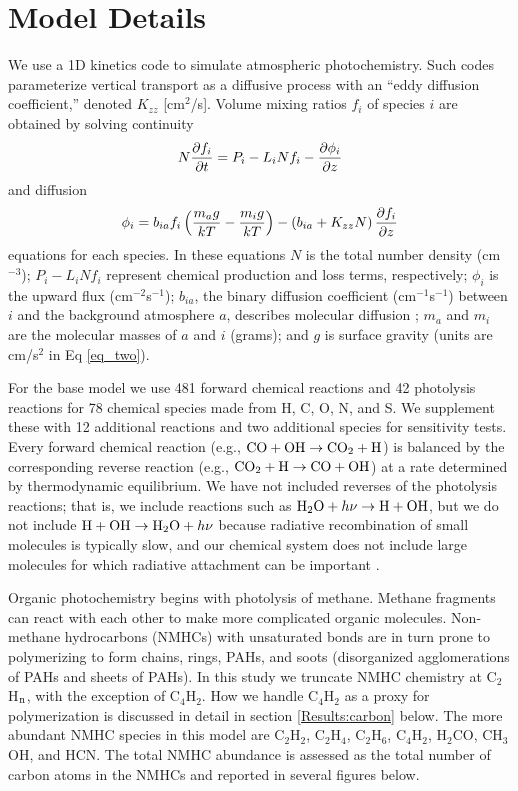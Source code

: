 \documentclass[preprint]{aastex6}
\newcounter{reaction}
\begin{document}
\section{Model Details}

We use a 1D kinetics code to simulate atmospheric photochemistry. 
Such codes parameterize vertical transport as a diffusive process 
with an ``eddy diffusion coefficient,'' denoted $K_{zz}$ [cm$^2$/s].
Volume mixing ratios $f_i$ of species $i$ are obtained by solving continuity
\begin{equation}
\label{eq_one}
N{\partial f_i \over \partial t} = P_i - L_i N f_i - {\partial \phi_i \over \partial z} 
\end{equation}
\noindent and diffusion
\begin{equation}
\label{eq_two}
\phi_i = b_{ia} f_i \left( {m_a g\over kT} - {m_i g\over kT}\right) - \left( b_{ia} + K_{zz}N\right) {\partial f_i \over \partial z}
\end{equation}
\noindent equations for each species.
In these equations $N$ is the total number density (cm$^{-3}$);
$P_i - L_i N f_i$ represent chemical production and loss terms, respectively;
$\phi_i$ is the upward flux (cm$^{-2}$s$^{-1}$); $b_{ia}$, the binary diffusion coefficient (cm$^{-1}$s$^{-1}$) between $i$ and the background atmosphere $a$, describes molecular diffusion ; $m_a$ and $m_i$ are the molecular masses of $a$ and $i$ (grams); {\color{red} and $g$ is surface gravity (units are cm/s$^{2}$ in Eq \ref{eq_two}).}
 
For the base model we use 481 forward chemical reactions and 42 photolysis reactions for 78 chemical species made from H, C, O, N, and S.
We supplement these with 12 additional reactions and two additional species for sensitivity tests. %
Every forward chemical reaction (e.g., ${\rm CO} + {\rm OH} \rightarrow {\rm CO}_2 + {\rm H}$) is balanced by the corresponding reverse reaction (e.g., ${\rm CO}_2 + {\rm H} \rightarrow  {\rm CO} + {\rm OH} $) at a rate determined by thermodynamic equilibrium.
 We have not included reverses of the photolysis reactions; that is, we include reactions such as 
 ${\rm H}_2{\rm O} + h\nu \rightarrow  {\rm H} + {\rm OH} $, but we do not include
 ${\rm H} + {\rm OH} \rightarrow {\rm H}_2{\rm O} + h\nu$ because radiative recombination of small
 molecules is typically slow, and our chemical system does not include large molecules for which radiative attachment can
 be important \citep{Vuitton2012}.

Organic photochemistry begins with photolysis of methane.  Methane fragments can react with each other
to make more complicated organic molecules.
Non-methane hydrocarbons (NMHCs) with unsaturated bonds are in turn prone to polymerizing to form chains, rings, 
PAHs, and soots (disorganized agglomerations of PAHs and sheets of PAHs).
In this study we truncate NMHC chemistry at C$_2$H$_{\rm n}$, with the exception of C$_4$H$_2$.
How we handle C$_4$H$_2$ as a proxy for polymerization is discussed in detail in section \ref{Results:carbon} below. 
The more abundant NMHC species in this model are C$_2$H$_2$, C$_2$H$_4$, C$_2$H$_6$, C$_4$H$_2$,
H$_2$CO, CH$_3$OH, and HCN.  
The total NMHC abundance is assessed as the total number of carbon atoms in the NMHCs and reported in several figures below.
\end{document}
